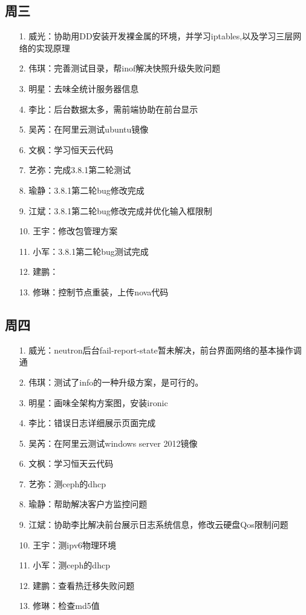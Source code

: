 \documentclass[a4paper,left=1.5cm,right=1.5cm,11pt]{article}
\begin{document}
\subsection{周三}
    \begin{itemize}
       \item[1.]威光：协助用DD安装开发裸金属的环境，并学习iptables,以及学习三层网络的实现原理
		\item[2.]伟琪：完善测试目录，帮inof解决快照升级失败问题
		\item[3.]明星：去味全统计服务器信息
		\item[4.]李比：后台数据太多，需前端协助在前台显示
		\item[5.]吴芮：在阿里云测试ubuntu镜像
		\item[6.]文枫：学习恒天云代码
		\item[7.]艺弥：完成3.8.1第二轮测试
		\item[8.]瑜静：3.8.1第二轮bug修改完成
		\item[9.]江斌：3.8.1第二轮bug修改完成并优化输入框限制
		\item[10.]王宇：修改包管理方案
		\item[11.]小军：3.8.1第二轮bug测试完成
		\item[12.]建鹏：
		\item[13.]修琳：控制节点重装，上传nova代码
    \end{itemize}
\subsection{周四}
    \begin{itemize}
       \item[1.]威光：neutron后台fail-report-state暂未解决，前台界面网络的基本操作调通
		\item[2.]伟琪：测试了info的一种升级方案，是可行的。
		\item[3.]明星：画味全架构方案图，安装ironic
		\item[4.]李比：错误日志详细展示页面完成
		\item[5.]吴芮：在阿里云测试windows server 2012镜像
		\item[6.]文枫：学习恒天云代码
		\item[7.]艺弥：测ceph的dhcp
		\item[8.]瑜静：帮助解决客户方监控问题
		\item[9.]江斌：协助李比解决前台展示日志系统信息，修改云硬盘Qos限制问题
		\item[10.]王宇：测ipv6物理环境
		\item[11.]小军：测ceph的dhcp
		\item[12.]建鹏：查看热迁移失败问题
		\item[13.]修琳：检查md5值
    \end{itemize}
\end{document}
